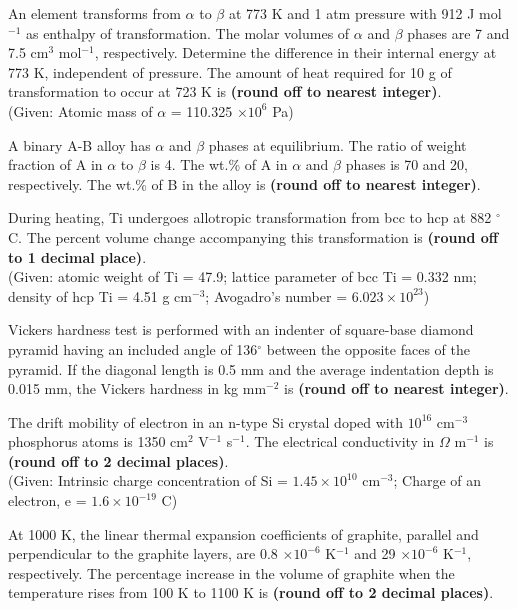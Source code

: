     \item An element transforms from $\alpha$ to $\beta$ at 773 K and 1 atm pressure with 912 J mol$^{-1}$ as enthalpy of transformation. The molar volumes of $\alpha$ and $\beta$ phases are 7 and 7.5 cm$^3$ mol$^{-1}$, respectively. Determine the difference in their internal energy at 773 K, independent of pressure. The amount of heat required for 10 g of transformation to occur at 723 K is \textbf{(round off to nearest integer)}. \\
    (Given: Atomic mass of $\alpha$ = 110.325 $\times 10^6$ Pa)

    \item A binary A-B alloy has $\alpha$ and $\beta$ phases at equilibrium. The ratio of weight fraction of A in $\alpha$ to $\beta$ is 4. The wt.\% of A in $\alpha$ and $\beta$ phases is 70 and 20, respectively. The wt.\% of B in the alloy is \textbf{(round off to nearest integer)}.

    \item During heating, Ti undergoes allotropic transformation from bcc to hcp at 882 $^{\circ}$C. The percent volume change accompanying this transformation is \textbf{(round off to 1 decimal place)}. \\
    (Given: atomic weight of Ti = 47.9; lattice parameter of bcc Ti = 0.332 nm; density of hcp Ti = 4.51 g cm$^{-3}$; Avogadro's number = $6.023 \times 10^{23}$)

    \item Vickers hardness test is performed with an indenter of square-base diamond pyramid having an included angle of 136$^{\circ}$ between the opposite faces of the pyramid. If the diagonal length is 0.5 mm and the average indentation depth is 0.015 mm, the Vickers hardness in kg mm$^{-2}$ is \textbf{(round off to nearest integer)}.

    \item The drift mobility of electron in an n-type Si crystal doped with $10^{16}$ cm$^{-3}$ phosphorus atoms is 1350 cm$^2$ V$^{-1}$ s$^{-1}$. The electrical conductivity in $\Omega$ m$^{-1}$ is \textbf{(round off to 2 decimal places)}. \\
    (Given: Intrinsic charge concentration of Si = $1.45 \times 10^{10}$ cm$^{-3}$; Charge of an electron, e = $1.6 \times 10^{-19}$ C)

    \item At 1000 K, the linear thermal expansion coefficients of graphite, parallel and perpendicular to the graphite layers, are 0.8 $\times 10^{-6}$ K$^{-1}$ and 29 $\times 10^{-6}$ K$^{-1}$, respectively. The percentage increase in the volume of graphite when the temperature rises from 100 K to 1100 K is \textbf{(round off to 2 decimal places)}.

